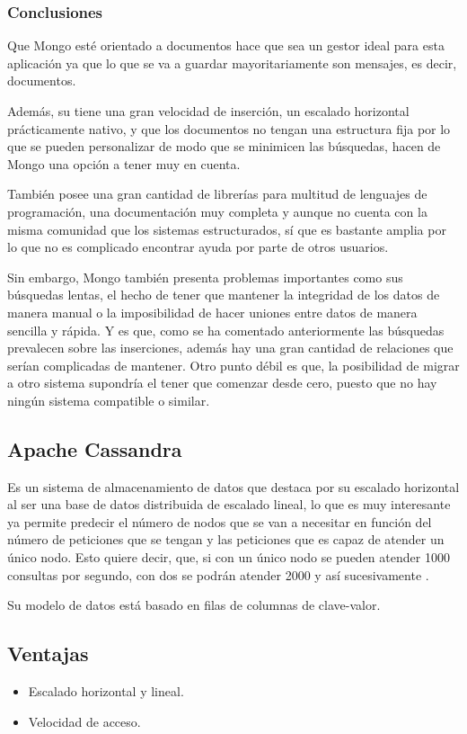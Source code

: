 \subsubsection{Conclusiones}
Que Mongo esté orientado a documentos hace que sea un gestor ideal para esta aplicación ya que lo que se va a guardar mayoritariamente son mensajes, es decir, documentos. 

Además, su tiene una gran velocidad de inserción, un escalado horizontal prácticamente nativo, y que los documentos no tengan una estructura fija por lo que se pueden personalizar de modo que se minimicen las búsquedas, hacen de Mongo una opción a tener muy en cuenta. 

También posee una gran cantidad de librerías para multitud de lenguajes de programación, una documentación muy completa y aunque no cuenta con la misma comunidad que los sistemas estructurados, sí que es bastante amplia por lo que no es complicado encontrar ayuda por parte de otros usuarios. 

Sin embargo, Mongo también presenta problemas importantes como sus búsquedas lentas, el hecho de tener que mantener la integridad de los datos de manera manual o la imposibilidad de hacer uniones entre datos de manera sencilla y rápida. Y es que, como se ha comentado anteriormente las búsquedas prevalecen sobre las inserciones, además hay una gran cantidad de relaciones que serían complicadas de mantener.
Otro punto débil es que, la posibilidad de migrar a otro sistema supondría el tener que comenzar desde cero, puesto que no hay ningún sistema compatible o similar. 

\subsection{Apache Cassandra}
Es un sistema de almacenamiento de datos que destaca por su escalado horizontal al ser una base de datos distribuida de escalado lineal, lo que es muy interesante ya permite predecir el número de nodos que se van a necesitar en función del número de peticiones que se tengan y las peticiones que es capaz de atender un único nodo. Esto quiere decir, que, si con un único nodo se pueden atender 1000 consultas por segundo, con dos se podrán atender 2000 y así sucesivamente \cite{Apache_Cassandra}. 

Su modelo de datos está basado en filas de columnas de clave-valor. 
\subsection{Ventajas}
\begin{itemize}
    \item Escalado horizontal y lineal.
    \item Velocidad de acceso.
\end{itemize}
